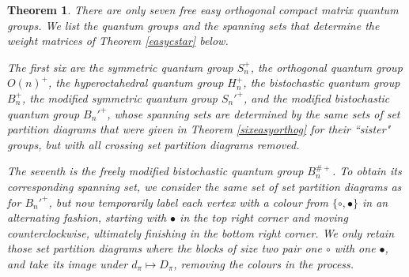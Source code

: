 \documentclass{article}
\theoremstyle{plain}
\newtheorem{theorem}{Theorem}[section]
\theoremstyle{definition}
\theoremstyle{remark}
\begin{document}

\begin{theorem} \label{seveneasyorthog}
There are only seven free easy orthogonal compact matrix quantum groups. 
We list the quantum groups and the spanning sets that determine the weight matrices of 
Theorem \ref{easycstar} below.

The first six are 
	the symmetric quantum group $S_n^{+}$, 
	the orthogonal quantum group $O(n)^{+}$, 
	the hyperoctahedral quantum group $H_n^{+}$,
	the bistochastic quantum group $B_n^{+}$,
	the modified symmetric quantum group $S_n'^{+}$, and
	the modified bistochastic quantum group $B_n'^{+}$,
	whose spanning sets are 
	determined by the same sets of set partition diagrams
	that were given in Theorem \ref{sixeasyorthog}
	for their ``sister" groups,
	but with all crossing set partition diagrams removed.
		
The seventh is
	the freely modified bistochastic quantum group $B_n^{\#{+}}$.
	To obtain its corresponding spanning set, 
	we consider the same set of set partition diagrams as for $B_n'^{+}$,
	but now temporarily label each vertex with a colour from
	$\{\circ, \bullet\}$ in an alternating fashion, starting with $\bullet$ in the top right corner and moving counterclockwise, ultimately finishing in the bottom right corner.
	We only retain those set partition diagrams where the blocks of size two pair one $\circ$ with one $\bullet$, and take its image under $d_\pi \mapsto D_\pi$, removing the colours in the process.
%


\end{theorem}
\end{document}
